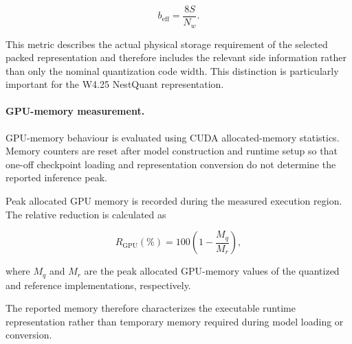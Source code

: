 \begin{equation}
b_{\mathrm{eff}}
=
\frac{8S}{N_w}.
\label{eq:effective-bit-rate}
\end{equation}

This metric describes the actual physical storage requirement of the
selected packed representation and therefore includes the relevant
side information rather than only the nominal quantization code width.
This distinction is particularly important for the W4.25 NestQuant
representation.


\paragraph{GPU-memory measurement.}

GPU-memory behaviour is evaluated using CUDA allocated-memory
statistics. Memory counters are reset after model construction and
runtime setup so that one-off checkpoint loading and representation
conversion do not determine the reported inference peak.

Peak allocated GPU memory is recorded during the measured execution
region. The relative reduction is calculated as

\begin{equation}
R_{\mathrm{GPU}}(\%)
=
100
\left(
1-
\frac{M_q}{M_r}
\right),
\label{eq:gpu-memory-reduction}
\end{equation}

where \(M_q\) and \(M_r\) are the peak allocated GPU-memory values of
the quantized and reference implementations, respectively.

The reported memory therefore characterizes the executable runtime
representation rather than temporary memory required during model
loading or conversion.
